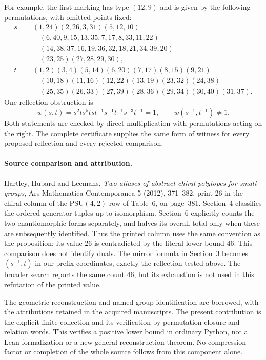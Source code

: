 \documentclass[11pt,a4paper]{article}
\begin{document}
For example, the first marking has type $(12,9)$ and is given by
the following permutations, with omitted points fixed:
\begin{align*}
s={}&(1,24)(2,26,3,31)(5,12,10)\\
 &\quad(6,40,9,15,13,35,7,17,8,33,11,22)\\
 &\quad(14,38,37,16,19,36,32,18,21,34,39,20)\\
 &\quad(23,25)(27,28,29,30),\\
t={}&(1,2)(3,4)(5,14)(6,20)(7,17)(8,15)(9,21)\\
 &\quad(10,18)(11,16)(12,22)(13,19)(23,32)(24,38)\\
 &\quad(25,35)(26,33)(27,39)(28,36)(29,34)(30,40)(31,37).
\end{align*}
One reflection obstruction is
\[
 w(s,t)=s^2t s^5t s t^{-1}s^{-1}t^{-1}s^{-3}t^{-1}=1,
 \qquad w(s^{-1},t^{-1})\ne1.
\]
Both statements are checked by direct multiplication with permutations
acting on the right. The complete certificate supplies the same form
of witness for every proposed reflection and every rejected comparison.

\paragraph{Source comparison and attribution.}
Hartley, Hubard and Leemans, \emph{Two atlases of abstract chiral
polytopes for small groups}, Ars Mathematica Contemporanea 5 (2012),
371--382, print 26 in the chiral column of the $\mathrm{PSU}(4,2)$
row of Table~6, on page~381. Section~4 classifies the ordered generator
tuples up to isomorphism. Section~6 explicitly counts the two
enantiomorphic forms separately, and halves its overall total only
when these are subsequently identified. Thus the printed column uses
the same convention as the proposition: its value 26 is contradicted
by the literal lower bound 46. This comparison does not identify duals.
The mirror formula in Section~3 becomes $(s^{-1},t)$ in our prefix
coordinates, exactly the reflection tested above. The broader search
reports the same count 46, but its exhaustion is not used in this
refutation of the printed value.

The geometric reconstruction and named-group identification are
borrowed, with the attributions retained in the acquired manuscripts.
The present contribution is the explicit finite collection and its
verification by permutation closure and relation words. This verifies
a positive lower bound in ordinary Python, not a Lean formalization
or a new general reconstruction theorem. No compression factor or
completion of the whole source follows from this component alone.
\end{document}
